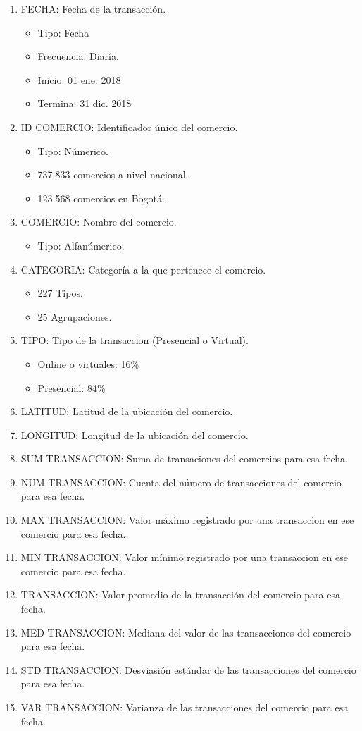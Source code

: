 \documentclass[a4paper]{article}
\begin{document}
\begin{multicols}{2}
	\begin{enumerate}
		\item FECHA: Fecha de la transacción.
		\begin{itemize}
			\item Tipo: Fecha
			\item Frecuencia: Diaría.
			\item Inicio: 01 ene. 2018
			\item Termina: 31 dic. 2018
		\end{itemize}
		\item ID COMERCIO: Identificador único del comercio.
		\begin{itemize}
			\item Tipo: Númerico.
			\item 737.833 comercios a nivel nacional.
			\item 123.568 comercios en Bogotá.
		\end{itemize}
		\item COMERCIO: Nombre del comercio.
		\begin{itemize}
			\item Tipo: Alfanúmerico.
		\end{itemize}
		\item CATEGORIA: Categoría a la que pertenece el comercio.
		\begin{itemize}
			\item 227 Tipos.
			\item 25 Agrupaciones.
		\end{itemize}
		\item TIPO: Tipo de la transaccion (Presencial o Virtual).
		\begin{itemize}
			\item Online o virtuales: 16\%
			\item Presencial: 84\%
		\end{itemize}
		\item LATITUD: Latitud de la ubicación del comercio.
		\item LONGITUD: Longitud de la ubicación del comercio.
		\item SUM TRANSACCION: Suma de transaciones del comercios para esa fecha.
		\item NUM TRANSACCION: Cuenta del número de transacciones del comercio para esa fecha.
		\item MAX TRANSACCION: Valor máximo registrado por una transaccion en ese comercio para esa fecha.
		\item MIN TRANSACCION: Valor mínimo registrado por una transaccion en ese comercio para esa fecha.
		\item TRANSACCION: Valor promedio de la transacción del comercio para esa fecha.
		\item MED TRANSACCION: Mediana del valor de las transacciones del comercio para esa fecha.
		\item STD TRANSACCION: Desviasión estándar de las transacciones del comercio para esa fecha.
		\item VAR TRANSACCION: Varianza de las transacciones del comercio para esa fecha.
	\end{enumerate}
\end{multicols}
\end{document}
